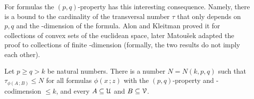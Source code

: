\documentclass[scombinatorics.tex]{subfiles}
\begin{document}
For {\nip} formulas the $(p,q)$-property has this interesting consequence.
Namely, there is a bound to the cardinality of the transversal number $\tau$ that only depends on $p,q$ and the \vc-dimension of the formula. Alon and Kleitman proved it for collections of convex sets of the euclidean space, later Matou\v{s}ek adapted the proof to collections of finite \vc-dimension (formally, the two results do not imply each other).

\begin{theorem}
  Let $p\ge q> k$ be natural numbers.
  There is a number $N=N(k,p,q)$ such that 
  $\tau_{\phi(A\,;B)}\le N$ for all formulas $\phi(x\,;z)$ with the $(p,q)$-property and \vc-codimension $\le k$, and every $A\subseteq\EuScript U$ and $B\subseteq\EuScript V$.
\end{theorem}
\end{document}
